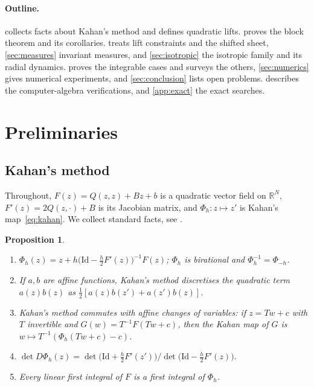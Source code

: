 \documentclass[11pt,a4paper]{article}
\newtheorem{proposition}[theorem]{Proposition}
\theoremstyle{definition}
\theoremstyle{remark}
\newcommand{\R}{\mathbb{R}}
\newcommand{\Id}{\mathrm{Id}}
\begin{document}
\paragraph{Outline.}
 collects facts about Kahan's method and defines quadratic lifts.  proves the
block theorem and its corollaries.  treats lift constraints and the shifted sheet,
\cref{sec:measures} invariant measures, and \cref{sec:isotropic} the isotropic family and its radial
dynamics.  proves the integrable cases and surveys the others, \cref{sec:numerics} gives
numerical experiments, and \cref{sec:conclusion} lists open problems.  describes the
computer-algebra verifications, and \cref{app:exact} the exact searches.

\section{Preliminaries}\label{sec:prelim}

\subsection{Kahan's method}

Throughout, $F(z)=Q(z,z)+Bz+b$ is a quadratic vector field on $\R^N$, $F'(z)=2Q(z,\cdot)+B$ is its Jacobian
matrix, and $\Phi_h\colon z\mapsto z'$ is Kahan's map~\eqref{eq:kahan}. We collect standard facts, see
\cite{CMOQ13,CMMOQ14}.

\begin{proposition}\label{prop:basic}
\begin{enumerate}[label=(\alph*)]
\item $\Phi_h(z)=z+h\big(\Id-\tfrac h2F'(z)\big)^{-1}F(z)$; $\Phi_h$ is birational and $\Phi_h^{-1}=\Phi_{-h}$.
\item If $a,b$ are affine functions, Kahan's method discretises the quadratic term $a(z)b(z)$ as
  $\tfrac12[a(z)b(z')+a(z')b(z)]$.
\item Kahan's method commutes with affine changes of variables: if $z=Tw+c$ with $T$ invertible and
  $G(w)=T^{-1}F(Tw+c)$, then the Kahan map of $G$ is $w\mapsto T^{-1}(\Phi_h(Tw+c)-c)$.
\item $\det D\Phi_h(z)=\det\big(\Id+\tfrac h2F'(z')\big)/\det\big(\Id-\tfrac h2F'(z)\big)$.
\item Every linear first integral of $F$ is a first integral of $\Phi_h$.
\end{enumerate}
\end{proposition}
\end{document}
